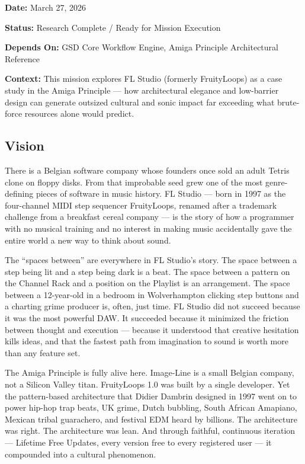\documentclass[11pt,letterpaper]{article}
\newcommand{\metafield}[2]{\textbf{\sffamily #1} #2\par}
\begin{document}
\metafield{Date:}{March 27, 2026}
\metafield{Status:}{Research Complete / Ready for Mission Execution}
\metafield{Depends On:}{GSD Core Workflow Engine, Amiga Principle Architectural Reference}
\metafield{Context:}{This mission explores FL Studio (formerly FruityLoops) as a case study in the Amiga Principle --- how architectural elegance and low-barrier design can generate outsized cultural and sonic impact far exceeding what brute-force resources alone would predict.}

\subsection{Vision}

There is a Belgian software company whose founders once sold an adult Tetris clone on floppy disks. From that improbable seed grew one of the most genre-defining pieces of software in music history. FL Studio --- born in 1997 as the four-channel MIDI step sequencer FruityLoops, renamed after a trademark challenge from a breakfast cereal company --- is the story of how a programmer with no musical training and no interest in making music accidentally gave the entire world a new way to think about sound.

The ``spaces between'' are everywhere in FL Studio's story. The space between a step being lit and a step being dark is a beat. The space between a pattern on the Channel Rack and a position on the Playlist is an arrangement. The space between a 12-year-old in a bedroom in Wolverhampton clicking step buttons and a charting grime producer is, often, just time. FL Studio did not succeed because it was the most powerful DAW. It succeeded because it minimized the friction between thought and execution --- because it understood that creative hesitation kills ideas, and that the fastest path from imagination to sound is worth more than any feature set.

The Amiga Principle is fully alive here. Image-Line is a small Belgian company, not a Silicon Valley titan. FruityLoops 1.0 was built by a single developer. Yet the pattern-based architecture that Didier Dambrin designed in 1997 went on to power hip-hop trap beats, UK grime, Dutch bubbling, South African Amapiano, Mexican tribal guarachero, and festival EDM heard by billions. The architecture was right. The architecture was lean. And through faithful, continuous iteration --- Lifetime Free Updates, every version free to every registered user --- it compounded into a cultural phenomenon.
\end{document}

